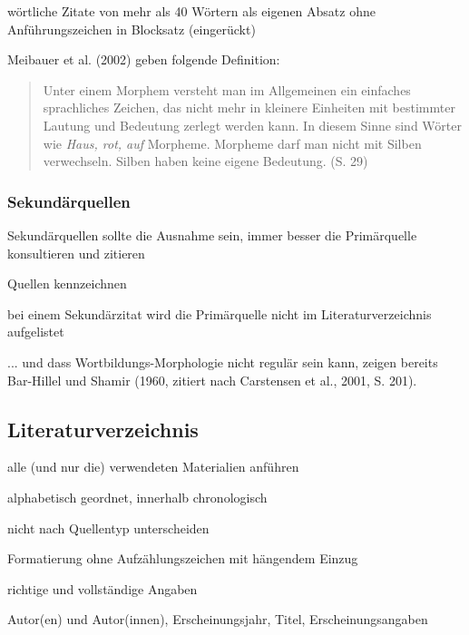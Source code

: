\documentclass[a4paper,oneside,DIV8,10pt]{scrartcl}
\newcommand{\zit}[1]{%
\fontfamily{phv}\selectfont #1\normalfont}
\begin{document}
        \begin{compactitem}
            \item wörtliche Zitate von mehr als 40 Wörtern als eigenen 
            Absatz ohne Anführungszeichen in Blocksatz (eingerückt)
        \end{compactitem}
        \zit{Meibauer et al. (2002) geben folgende Definition:}
        \begin{quote}
        \zit{
        Unter einem Morphem versteht man im Allgemeinen ein einfaches sprachliches
        Zeichen, das nicht mehr in kleinere Einheiten mit bestimmter Lautung 
        und Bedeutung zerlegt werden kann. In diesem Sinne sind Wörter wie 
        \textit{Haus, rot, auf} Morpheme. Morpheme darf man nicht mit 
        Silben verwechseln. Silben haben keine eigene Bedeutung. (S. 29)
        }
        \end{quote}
        
\subsubsection{Sekundärquellen}
        \begin{compactitem}
            \item Sekundärquellen sollte die Ausnahme sein, immer besser
            die Primärquelle konsultieren und zitieren
            \item Quellen kennzeichnen
            \item bei einem Sekundärzitat wird die Primärquelle nicht im
            Literaturverzeichnis aufgelistet
        \end{compactitem}
        \zit{... und dass Wortbildungs-Morphologie nicht regulär 
        sein kann, zeigen bereits Bar-Hillel und Shamir (1960, zitiert
        nach Carstensen et al., 2001, S. 201).}

    \subsection{Literaturverzeichnis}
        \begin{compactitem}
            \item alle (und nur die) verwendeten Materialien anführen 
            \item alphabetisch geordnet, innerhalb chronologisch
            \item nicht nach Quellentyp unterscheiden
            \item Formatierung ohne Aufzählungszeichen mit hängendem Einzug
            \item richtige und vollständige Angaben
            \item Autor(en) und Autor(innen), Erscheinungsjahr, Titel, Erscheinungsangaben
        \end{compactitem}
\end{document}
